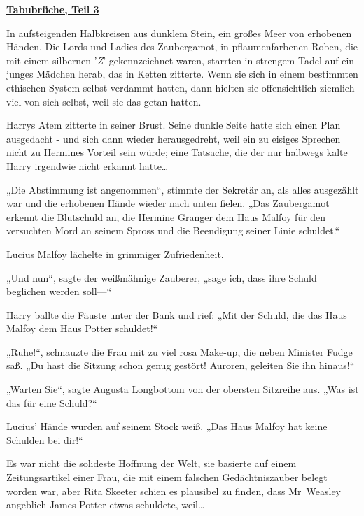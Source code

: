 

\hypertarget{tabubruxfcche-teil-3}{%

\textbf{\uline{Tabubrüche, Teil 3}}

In aufsteigenden Halbkreisen aus dunklem Stein, ein großes Meer von erhobenen Händen. Die Lords und Ladies des Zaubergamot, in pflaumenfarbenen Roben, die mit einem silbernen '\emph{Z}' gekennzeichnet waren, starrten in strengem Tadel auf ein junges Mädchen herab, das in Ketten zitterte. Wenn sie sich in einem bestimmten ethischen System selbst verdammt hatten, dann hielten sie offensichtlich ziemlich viel von sich selbst, weil sie das getan hatten.

Harrys Atem zitterte in seiner Brust. Seine dunkle Seite hatte sich einen Plan ausgedacht - und sich dann wieder herausgedreht, weil ein zu eisiges Sprechen nicht zu Hermines Vorteil sein würde; eine Tatsache, die der nur halbwegs kalte Harry irgendwie nicht erkannt hatte…

„Die Abstimmung ist angenommen“, stimmte der Sekretär an, als alles ausgezählt war und die erhobenen Hände wieder nach unten fielen. „Das Zaubergamot erkennt die Blutschuld an, die Hermine Granger dem Haus Malfoy für den versuchten Mord an seinem Spross und die Beendigung seiner Linie schuldet.“

Lucius Malfoy lächelte in grimmiger Zufriedenheit.

„Und nun“, sagte der weißmähnige Zauberer, „sage ich, dass ihre Schuld beglichen werden soll—“

Harry ballte die Fäuste unter der Bank und rief: „Mit der Schuld, die das Haus Malfoy dem Haus Potter schuldet!“

„Ruhe!“, schnauzte die Frau mit zu viel rosa Make-up, die neben Minister Fudge saß. „Du hast die Sitzung schon genug gestört! Auroren, geleiten Sie ihn hinaus!“

„Warten Sie“, sagte Augusta Longbottom von der obersten Sitzreihe aus. „Was ist das für eine Schuld?“

Lucius' Hände wurden auf seinem Stock weiß. „Das Haus Malfoy hat keine Schulden bei dir!“

Es war nicht die solideste Hoffnung der Welt, sie basierte auf einem Zeitungsartikel einer Frau, die mit einem falschen Gedächtniszauber belegt worden war, aber Rita Skeeter schien es plausibel zu finden, dass Mr~Weasley angeblich James Potter etwas schuldete, weil…

}
